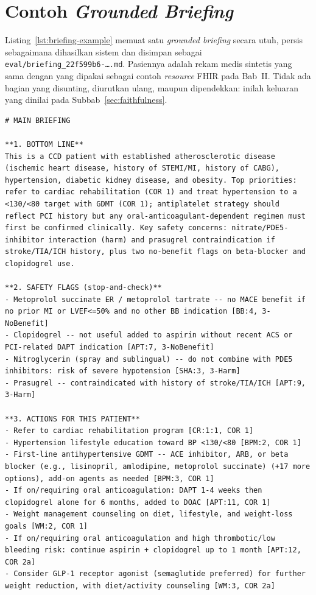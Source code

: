 \section{Contoh \emph{Grounded Briefing}}
\label{app:briefing}

Listing~\ref{lst:briefing-example} memuat satu \emph{grounded briefing} secara utuh, persis
sebagaimana dihasilkan sistem dan disimpan sebagai
\texttt{eval/briefing\_22f599b6-\ldots.md}. Pasiennya adalah rekam medis sintetis yang sama
dengan yang dipakai sebagai contoh \emph{resource} FHIR pada Bab~II. Tidak ada bagian yang
disunting, diurutkan ulang, maupun dipendekkan: inilah keluaran yang dinilai pada
Subbab~\ref{sec:faithfulness}.

\begin{lstlisting}[basicstyle=\scriptsize\ttfamily,numbers=none,caption={\emph{Grounded briefing} lengkap bagi satu pasien, sebagaimana dibangkitkan (\texttt{claude-sonnet-5}) dan disimpan pada \texttt{eval/}.},label={lst:briefing-example}]
# MAIN BRIEFING

**1. BOTTOM LINE**
This is a CCD patient with established atherosclerotic disease (ischemic heart disease, history of STEMI/MI, history of CABG), hypertension, diabetic kidney disease, and obesity. Top priorities: refer to cardiac rehabilitation (COR 1) and treat hypertension to a <130/<80 target with GDMT (COR 1); antiplatelet strategy should reflect PCI history but any oral-anticoagulant-dependent regimen must first be confirmed clinically. Key safety concerns: nitrate/PDE5-inhibitor interaction (harm) and prasugrel contraindication if stroke/TIA/ICH history, plus two no-benefit flags on beta-blocker and clopidogrel use.

**2. SAFETY FLAGS (stop-and-check)**
- Metoprolol succinate ER / metoprolol tartrate -- no MACE benefit if no prior MI or LVEF<=50% and no other BB indication [BB:4, 3-NoBenefit]
- Clopidogrel -- not useful added to aspirin without recent ACS or PCI-related DAPT indication [APT:7, 3-NoBenefit]
- Nitroglycerin (spray and sublingual) -- do not combine with PDE5 inhibitors: risk of severe hypotension [SHA:3, 3-Harm]
- Prasugrel -- contraindicated with history of stroke/TIA/ICH [APT:9, 3-Harm]

**3. ACTIONS FOR THIS PATIENT**
- Refer to cardiac rehabilitation program [CR:1:1, COR 1]
- Hypertension lifestyle education toward BP <130/<80 [BPM:2, COR 1]
- First-line antihypertensive GDMT -- ACE inhibitor, ARB, or beta blocker (e.g., lisinopril, amlodipine, metoprolol succinate) (+17 more options), add-on agents as needed [BPM:3, COR 1]
- If on/requiring oral anticoagulation: DAPT 1-4 weeks then clopidogrel alone for 6 months, added to DOAC [APT:11, COR 1]
- Weight management counseling on diet, lifestyle, and weight-loss goals [WM:2, COR 1]
- If on/requiring oral anticoagulation and high thrombotic/low bleeding risk: continue aspirin + clopidogrel up to 1 month [APT:12, COR 2a]
- Consider GLP-1 receptor agonist (semaglutide preferred) for further weight reduction, with diet/activity counseling [WM:3, COR 2a]


\end{lstlisting}
